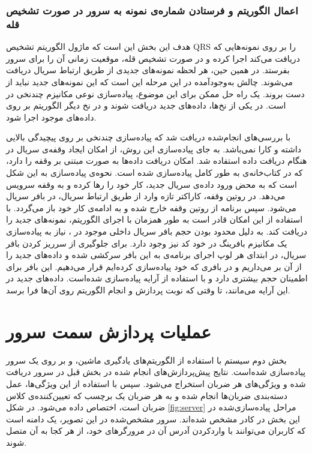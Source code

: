 \subsubsection{اعمال الگوریتم و فرستادن شماره‌ی نمونه به  سرور
 در صورت تشخیص قله}
	 هدف این بخش این است که  ماژول  الگوریتم تشخیص QRS را بر روی نمونه‌هایی که دریافت می‌کند اجرا کرده و در صورت تشخیص قله، موقعیت زمانی آن را برای سرور بفرستد. در همین حین، هر لحظه نمونه‌های جدیدی از طریق ارتباط سریال دریافت می‌شوند. چالش به‌وجودآمده در این مرحله این است که این نمونه‌های جدید نباید از دست بروند. یک راه حل ممکن برای این موضوع،‌ پیاده‌سازی نوعی مکانیزم چندنخی در  است. در یکی از نخ‌ها، داده‌های جدید دریافت شوند و در نخ دیگر الگوریتم بر روی داده‌‌های موجود اجرا شود.
	 
با بررسی‌های انجام‌شده دریافت شد که پیاده‌سازی چندنخی بر روی  پیچیدگی بالایی داشته و کارا نمی‌باشد. به جای پیاده‌سازی این روش، از امکان ایجاد وقفه‌ی سریال در هنگام دریافت داده استفاده شد.  امکان دریافت داده‌ها به صورت مبتنی بر وقفه را دارد، که در کتاب‌خانه‌ی  به طور کامل پیاده‌سازی شده است. نحوه‌ی پیاده‌سازی به این شکل است که به محض ورود داده‌ی سریال جدید،  کار خود را رها کرده و به وقفه سرویس می‌دهد. در روتین وقفه، کاراکتر تازه وارد از طریق ارتباط سریال، در بافر سریال  می‌شود. سپس برنامه از روتین وقفه خارج شده و به ادامه‌ی کار خود باز می‌گردد. با استفاده از این امکان  قادر است به طور همزمان با اجرای الگوریتم، نمونه‌های جدید را دریافت کند. به دلیل محدود بودن حجم بافر سریال داخلی موجود در ، نیاز به پیاده‌سازی یک مکانیزم بافرینگ در خود کد نیز وجود دارد. برای جلوگیری از سرریز کردن بافر سریال، در ابتدای هر لوپ اجرای برنامه‌ی  به این بافر سرکشی شده و داده‌های جدید را از آن بر می‌داریم و در بافری که خود پیاده‌سازی کرده‌ایم قرار می‌دهیم. این بافر برای اطمینان حجم بیشتری دارد و با استفاده از آرایه پیاده‌سازی شده‌است. داده‌های جدید در این آرایه می‌مانند، تا وقتی که نوبت پردازش و انجام الگوریتم روی آن‌ها فرا برسد.

	

\section{عملیات پردازش سمت سرور}
بخش دوم سیستم با استفاده از الگوریتم‌های یادگیری ماشین، و بر روی یک سرور پیاده‌سازی شده‌است. نتایج پیش‌پردازش‌های انجام شده در بخش قبل در سرور دریافت شده و ویژگی‌های هر ضربان استخراج می‌شود. سپس با استفاده از این ویژگی‌ها، عمل دسته‌بندی ضربان‌ها انجام شده و به هر ضربان یک برچسب که تعیین‌کننده‌ی کلاس ضربان است، اختصاص داده می‌شود. در شکل \ref{fig:server} مراحل پیاده‌سازی‌شده در این بخش در کادر مشخص شده‌اند. سرور مشخص‌شده در این تصویر، یک دامنه است که کاربران می‌توانند با واردکردن آدرس آن در مرورگرهای خود، از هر کجا به آن متصل شوند.

